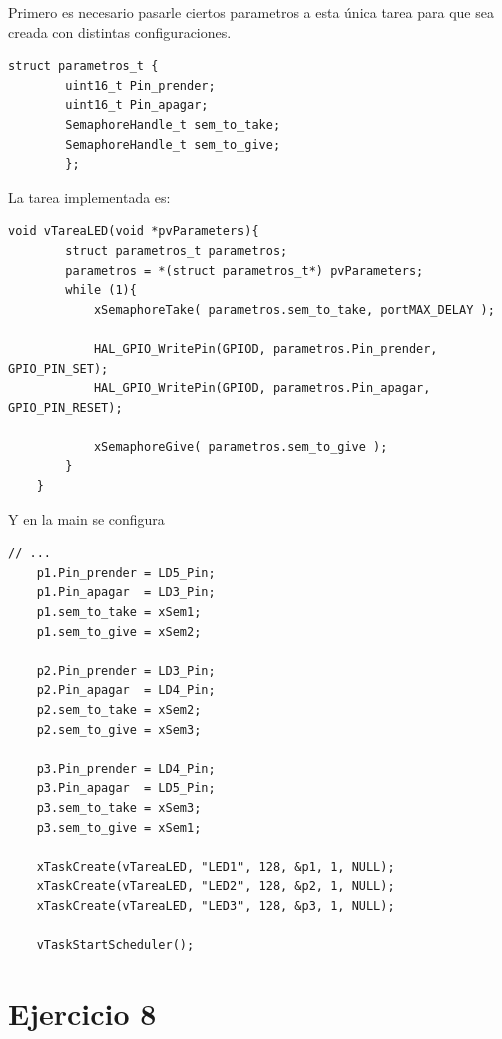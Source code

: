 \documentclass[12pt]{article}
\begin{document}
Primero es necesario pasarle ciertos parametros a esta única tarea
para que sea creada con distintas configuraciones.
\begin{lstlisting}[style=CStyle]
    struct parametros_t {
        uint16_t Pin_prender;
        uint16_t Pin_apagar;
        SemaphoreHandle_t sem_to_take;
        SemaphoreHandle_t sem_to_give;
        };
\end{lstlisting}
\pagebreak
La tarea implementada es:
\begin{lstlisting}[style=CStyle]
    void vTareaLED(void *pvParameters){
        struct parametros_t parametros;
        parametros = *(struct parametros_t*) pvParameters;
        while (1){
            xSemaphoreTake( parametros.sem_to_take, portMAX_DELAY );

            HAL_GPIO_WritePin(GPIOD, parametros.Pin_prender, GPIO_PIN_SET);
            HAL_GPIO_WritePin(GPIOD, parametros.Pin_apagar, GPIO_PIN_RESET);

            xSemaphoreGive( parametros.sem_to_give );
        }
    }
\end{lstlisting}
Y en la main se configura
\begin{lstlisting}[style=CStyle]
    // ...
    p1.Pin_prender = LD5_Pin;
    p1.Pin_apagar  = LD3_Pin;
    p1.sem_to_take = xSem1;
    p1.sem_to_give = xSem2;
   
    p2.Pin_prender = LD3_Pin;
    p2.Pin_apagar  = LD4_Pin;
    p2.sem_to_take = xSem2;
    p2.sem_to_give = xSem3;
   
    p3.Pin_prender = LD4_Pin;
    p3.Pin_apagar  = LD5_Pin;
    p3.sem_to_take = xSem3;
    p3.sem_to_give = xSem1;
   
    xTaskCreate(vTareaLED, "LED1", 128, &p1, 1, NULL);
    xTaskCreate(vTareaLED, "LED2", 128, &p2, 1, NULL);
    xTaskCreate(vTareaLED, "LED3", 128, &p3, 1, NULL);

    vTaskStartScheduler();
\end{lstlisting}

\pagebreak
\section{Ejercicio 8}
\end{document}
